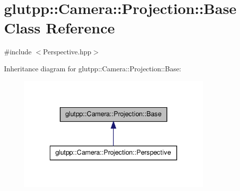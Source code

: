 \hypertarget{classglutpp_1_1Camera_1_1Projection_1_1Base}{\section{glutpp\-:\-:\-Camera\-:\-:\-Projection\-:\-:\-Base \-Class \-Reference}
\label{classglutpp_1_1Camera_1_1Projection_1_1Base}
}


 




{\ttfamily \#include $<$\-Perspective.\-hpp$>$}



\-Inheritance diagram for glutpp\-:\-:\-Camera\-:\-:\-Projection\-:\-:\-Base\-:
\nopagebreak
\begin{figure}[H]
\begin{center}
\leavevmode
\includegraphics[width=270pt]{classglutpp_1_1Camera_1_1Projection_1_1Base__inherit__graph}
\end{center}
\end{figure}
